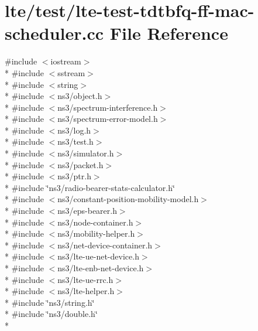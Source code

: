 \hypertarget{lte-test-tdtbfq-ff-mac-scheduler_8cc}{}\section{lte/test/lte-\/test-\/tdtbfq-\/ff-\/mac-\/scheduler.cc File Reference}
\label{lte-test-tdtbfq-ff-mac-scheduler_8cc}
{\ttfamily \#include $<$iostream$>$}\\*
{\ttfamily \#include $<$sstream$>$}\\*
{\ttfamily \#include $<$string$>$}\\*
{\ttfamily \#include $<$ns3/object.\+h$>$}\\*
{\ttfamily \#include $<$ns3/spectrum-\/interference.\+h$>$}\\*
{\ttfamily \#include $<$ns3/spectrum-\/error-\/model.\+h$>$}\\*
{\ttfamily \#include $<$ns3/log.\+h$>$}\\*
{\ttfamily \#include $<$ns3/test.\+h$>$}\\*
{\ttfamily \#include $<$ns3/simulator.\+h$>$}\\*
{\ttfamily \#include $<$ns3/packet.\+h$>$}\\*
{\ttfamily \#include $<$ns3/ptr.\+h$>$}\\*
{\ttfamily \#include \char`\"{}ns3/radio-\/bearer-\/stats-\/calculator.\+h\char`\"{}}\\*
{\ttfamily \#include $<$ns3/constant-\/position-\/mobility-\/model.\+h$>$}\\*
{\ttfamily \#include $<$ns3/eps-\/bearer.\+h$>$}\\*
{\ttfamily \#include $<$ns3/node-\/container.\+h$>$}\\*
{\ttfamily \#include $<$ns3/mobility-\/helper.\+h$>$}\\*
{\ttfamily \#include $<$ns3/net-\/device-\/container.\+h$>$}\\*
{\ttfamily \#include $<$ns3/lte-\/ue-\/net-\/device.\+h$>$}\\*
{\ttfamily \#include $<$ns3/lte-\/enb-\/net-\/device.\+h$>$}\\*
{\ttfamily \#include $<$ns3/lte-\/ue-\/rrc.\+h$>$}\\*
{\ttfamily \#include $<$ns3/lte-\/helper.\+h$>$}\\*
{\ttfamily \#include \char`\"{}ns3/string.\+h\char`\"{}}\\*
{\ttfamily \#include \char`\"{}ns3/double.\+h\char`\"{}}\\*
